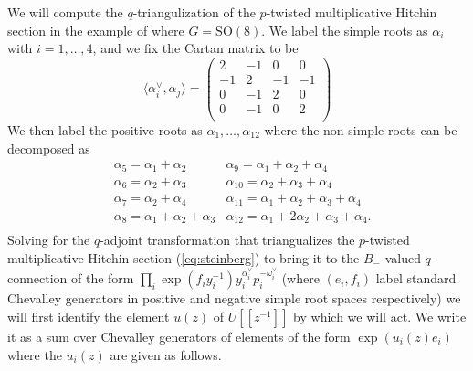 \documentclass[11pt, oneside, reqno]{amsart}
\theoremstyle{definition} \newtheorem{definition}{Definition}[section]
\theoremstyle{definition} \newtheorem{remark}[definition]{Remark}
\theoremstyle{definition} \newtheorem{remarks}[definition]{Remarks}
\theoremstyle{definition} \newtheorem{question}[definition]{Question}
\theoremstyle{definition} \newtheorem*{note}{Note}
\theoremstyle{definition} \newtheorem{example}[definition]{Example}
\theoremstyle{definition} \newtheorem{examples}[definition]{Examples}
\newcommand{\SO}{\mathrm{SO}}
\begin{document}
We will compute the $q$-triangulization of the $p$-twisted multiplicative Hitchin section in the example of where $G = \SO(8)$.  We label the simple roots as $\alpha_i$ with $i = 1, \dots, 4$, and we fix the Cartan matrix to be 
\[
\langle \alpha_i^{\vee}, \alpha_j \rangle  =
\begin{pmatrix}
 2 & -1 & 0 & 0 \\
 -1 & 2 & -1 & -1 \\
 0 & -1 & 2 & 0 \\
 0 & -1 & 0 & 2 \\
\end{pmatrix}
\]
We then label the positive roots as $\alpha_1, \dots, \alpha_{12}$ where the non-simple roots can be decomposed as
\begin{align*}
 &\alpha _5= \alpha _1+\alpha _2 &\alpha _9= \alpha _1+\alpha _2+\alpha _4 \\
 &\alpha _6= \alpha _2+\alpha _3 &\alpha _{10}= \alpha _2+\alpha _3+\alpha _4 \\
 &\alpha _7= \alpha _2+\alpha _4 &\alpha _{11}= \alpha _1+\alpha _2+\alpha _3+\alpha _4 \\
 &\alpha _8= \alpha _1+\alpha _2+\alpha _3 &\alpha _{12}= \alpha _1+2 \alpha _2+\alpha _3+\alpha _4. \\
\end{align*}
Solving for the $q$-adjoint transformation that triangualizes the $p$-twisted multiplicative Hitchin section (\ref{eq:steinberg}) to bring it to the $B_{-}$ valued $q$-connection of the form $ \prod_{i} \exp(f_i y_i^{-1}) y_i^{\alpha_i^{\vee}} p_i^{-\omega_i^{\vee}}$ (where $(e_i, f_i)$ label standard Chevalley generators in positive and negative simple root spaces respectively) we will first identify the element $u(z)$ of $U[[z^{-1}]]$ by which we will act.  We write it as a sum over Chevalley generators of elements of the form $\exp(u_i(z) e_i)$ where the $u_i(z)$ are given as follows.
\end{document}
